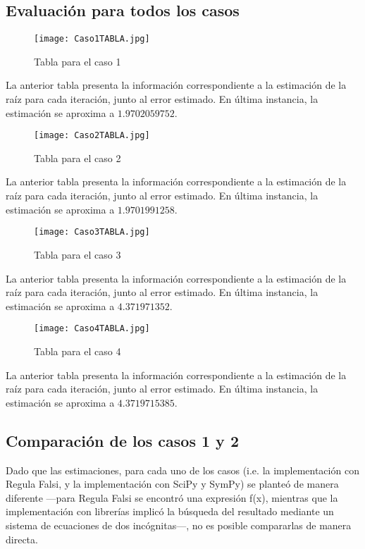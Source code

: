 \documentclass{article}
\begin{document}
\subsection{Evaluación para todos los casos}
\begin{figure}[H]
    \centering
    \texttt{[image: Caso1TABLA.jpg]}
    \caption{Tabla para el caso 1}
    \label{fig:TablaRFC1}
\end{figure}
La anterior tabla presenta la información correspondiente a la estimación de la raíz para cada iteración, junto al error estimado. En última instancia, la estimación se aproxima a \(1.9702059752\).
\begin{figure}[H]
    \centering
    \texttt{[image: Caso2TABLA.jpg]}
    \caption{Tabla para el caso 2}
    \label{fig:TablaRFC2}
\end{figure}
La anterior tabla presenta la información correspondiente a la estimación de la raíz para cada iteración, junto al error estimado. En última instancia, la estimación se aproxima a \(1.9701991258\).
\begin{figure}[H]
    \centering
    \texttt{[image: Caso3TABLA.jpg]}
    \caption{Tabla para el caso 3}
    \label{fig:TablaRFC3}
\end{figure}
La anterior tabla presenta la información correspondiente a la estimación de la raíz para cada iteración, junto al error estimado. En última instancia, la estimación se aproxima a \(4.371971352\).
\begin{figure}[H]
    \centering
    \texttt{[image: Caso4TABLA.jpg]}
    \caption{Tabla para el caso 4}
    \label{fig:TablaRFC4}
\end{figure}
La anterior tabla presenta la información correspondiente a la estimación de la raíz para cada iteración, junto al error estimado. En última instancia, la estimación se aproxima a \(4.3719715385\).

\subsection{Comparación de los casos 1 y 2}
Dado que las estimaciones, para cada uno de los casos (i.e. la implementación con Regula Falsi, y la implementación con SciPy y SymPy) se planteó de manera diferente —para Regula Falsi se encontró una expresión f(x), mientras que la implementación con librerías implicó la búsqueda del resultado mediante un sistema de ecuaciones de dos incógnitas—, no es posible compararlas de manera directa.
\end{document}
